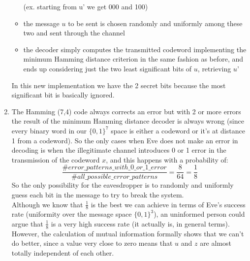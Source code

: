 \documentclass{report}
\begin{document}
\begin{enumerate}
\begin{itemize}
(ex. starting from u’ we get 000 and 100)
\item the message $u$ to be sent is chosen randomly and uniformly among these two and sent through the channel
\item the decoder simply computes the transmitted codeword implementing the minimum Hamming  distance criterion in the same fashion as before, and ends up considering just the two least significant bits of $u$, retrieving $u’$ 
\end{itemize}
In this new implementation we have the 2 secret bits because the most significant bit is basically ignored.
\item The Hamming (7,4) code always corrects an error but with 2 or more errors the result of the  minimum Hamming distance decoder is always wrong (since every binary word in our $\{0,1\}^7$ space is either a codeword or it’s at distance 1 from a codeword). So the only cases when Eve does not make an error in decoding is when the illegitimate channel introduces 0 or 1 error in the transmission of the codeword $x$, and this happens with a probability of: 
\begin{equation*}
\frac{\#error\_patterns\_with\_0\_or\_1\_error}{\#all\_possible\_error\_patterns}=\frac{8}{64}=\frac{1}{8}
\end{equation*}
So the only possibility for the eavesdropper is to randomly and uniformly guess each bit in the message to try to break the system.\\
Although we know that $\frac{1}{8}$ is the best we can achieve in terms of Eve’s success rate (uniformity over the message space $\{0,1\}^3$), an uninformed person could argue that $\frac{1}{8}$ is a very high success rate (it actually is, in general terms). However, the calculation of mutual information formally shows that we can’t do better, since a value very close to zero means that $u$ and $z$ are almost totally independent of each other.
\end{enumerate}
\end{document}
